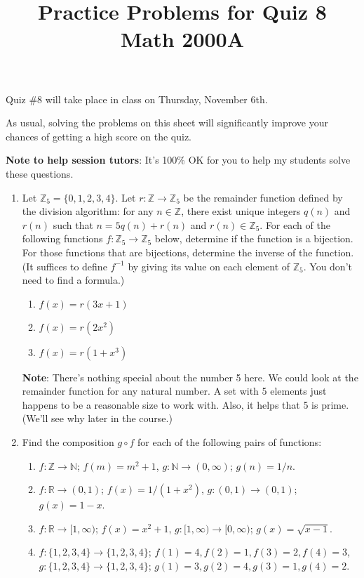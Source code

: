 \documentclass[letterpaper,12pt]{article}
\title{Practice Problems for Quiz 8\\Math 2000A}
\date{}
\newcommand{\N}{\mathbb{N}}
\newcommand{\Z}{\mathbb{Z}}
\newcommand{\R}{\mathbb{R}}
\begin{document}
 \maketitle
\vspace{-0.5in}

Quiz \#8 will take place in class on Thursday, November 6th. 

As usual, solving the problems on this sheet will significantly improve your chances of getting a high score on the quiz.

{\bf Note to help session tutors}: It's 100\% OK for you to help my students solve these questions.
\begin{enumerate}
\item Let $\Z_5 = \{0,1,2,3,4\}$. Let $r:\Z\to\Z_5$ be the remainder function defined by the division algorithm: for any $n\in\Z$, there exist unique integers $q(n)$ and $r(n)$ such that $n=5q(n)+r(n)$ and $r(n)\in\Z_5$. For each of the following functions $f:\Z_5\to \Z_5$ below, determine if the function is a bijection. For those functions that are bijections, determine the inverse of the function. (It suffices to define $f^{-1}$ by giving its value on each element of $\Z_5$. You don't need to find a formula.)
\begin{enumerate}
 \item $f(x) = r(3x+1)$
 \item $f(x) = r(2x^2)$
 \item $f(x) = r(1+x^3)$
\end{enumerate}
{\bf Note}: There's nothing special about the number 5 here. We could look at the remainder function for any natural number. A set with 5 elements just happens to be a reasonable size to work with. Also, it helps that 5 is prime. (We'll see why later in the course.)
 \item Find the composition $g\circ f$ for each of the following pairs of functions:
\begin{enumerate}
 \item $f:\Z\to\N$; $f(m)=m^2+1$, $g:\N\to (0,\infty)$; $g(n) = 1/n$.
 \item $f:\R\to (0,1)$; $f(x)=1/(1+x^2)$, $g:(0,1)\to (0,1)$; $g(x)=1-x$.
 \item $f:\R\to [1,\infty)$; $f(x)=x^2+1$, $g:[1,\infty)\to [0,\infty)$; $g(x)=\sqrt{x-1}$.
 \item $f:\{1,2,3,4\}\to \{1,2,3,4\}$; $f(1)=4, f(2)=1, f(3)=2, f(4)=3$,\\ $g:\{1,2,3,4\}\to\{1,2,3,4\}$; $g(1)=3, g(2)=4, g(3)=1, g(4)=2$.
\end{enumerate}

\end{enumerate}
\end{document}
